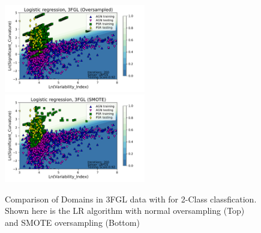 \begin{figure}[h]
\centering
\includegraphics[width=0.55\textwidth]{plots/classification_domains/domains_oversampled_LR_3FGL_2class.pdf}
\includegraphics[width=0.55\textwidth]{plots/classification_domains/domains_smote_LR_3FGL_2class.pdf}
\caption{Comparison of Domains in 3FGL data with for 2-Class classfication. Shown here is the LR algorithm with normal oversampling (Top) and SMOTE oversampling (Bottom)
}
\label{fig:domains_smote_over}
\end{figure}
